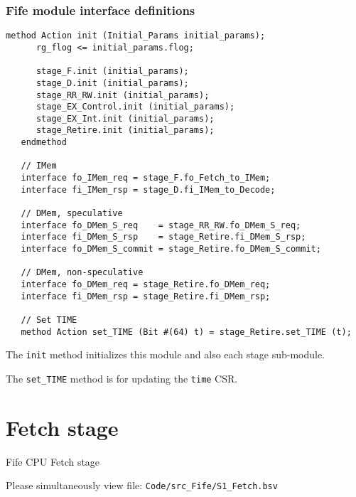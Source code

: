 
\begin{frame}[fragile]
\frametitle{Fife module interface definitions}

\footnotesize

\begin{minipage}{0.75\textwidth}\scriptsize
\begin{Verbatim}[frame=single, label=From src\_Fife/CPU.bsv]
   method Action init (Initial_Params initial_params);
      rg_flog <= initial_params.flog;

      stage_F.init (initial_params);
      stage_D.init (initial_params);
      stage_RR_RW.init (initial_params);
      stage_EX_Control.init (initial_params);
      stage_EX_Int.init (initial_params);
      stage_Retire.init (initial_params);
   endmethod

   // IMem
   interface fo_IMem_req = stage_F.fo_Fetch_to_IMem;
   interface fi_IMem_rsp = stage_D.fi_IMem_to_Decode;

   // DMem, speculative
   interface fo_DMem_S_req    = stage_RR_RW.fo_DMem_S_req;
   interface fi_DMem_S_rsp    = stage_Retire.fi_DMem_S_rsp;
   interface fo_DMem_S_commit = stage_Retire.fo_DMem_S_commit;

   // DMem, non-speculative
   interface fo_DMem_req = stage_Retire.fo_DMem_req;
   interface fi_DMem_rsp = stage_Retire.fi_DMem_rsp;

   // Set TIME
   method Action set_TIME (Bit #(64) t) = stage_Retire.set_TIME (t);
\end{Verbatim}
\end{minipage}
\hm
\begin{minipage}{0.22\textwidth}
The {\tt init} method initializes this module and also each stage sub-module.

\vspace{2ex}

The {\tt set\_TIME} method is for updating the {\tt time} CSR.
\end{minipage}

\end{frame}


\section{Fetch stage}

\begin{frame}[fragile]

\begin{center}
  {\LARGE Fife CPU Fetch stage}

  \vspace{10ex}

  Please simultaneously view file: \hm \verb|Code/src_Fife/S1_Fetch.bsv|
\end{center}

\end{frame}

